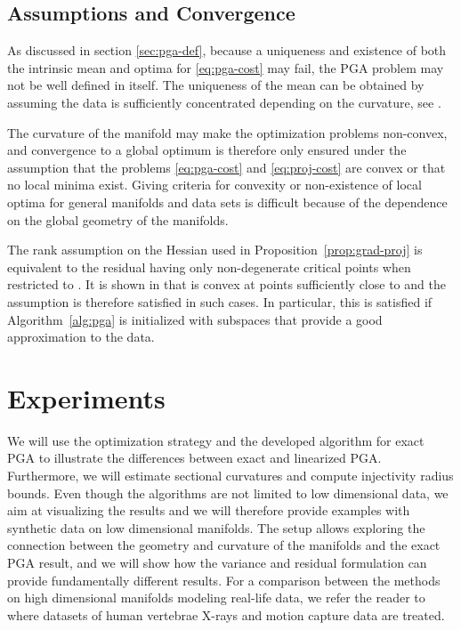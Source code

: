 \documentclass[final]{svjour3}
\begin{document}
\subsection{Assumptions and Convergence}
As discussed in section \ref{sec:pga-def}, because a uniqueness and existence of
both the intrinsic mean and optima for \eqref{eq:pga-cost} may fail, the PGA
problem may not be well defined in itself. The uniqueness of the mean can be
obtained by assuming the data is sufficiently concentrated depending on the
curvature, see \cite{karcher_riemannian_1977}.

The curvature of the manifold may make the optimization problems non-convex,
and convergence to a global optimum is therefore only
ensured under the assumption that the problems
\eqref{eq:pga-cost} and \eqref{eq:proj-cost} are convex or that no local minima
exist.  Giving criteria for convexity or non-existence of local optima for
general manifolds and data sets is 
difficult because of the dependence on the global geometry of the manifolds.

The rank assumption on the Hessian used in Proposition~\ref{prop:grad-proj} is
equivalent to the residual  having only non-degenerate critical points when
restricted to . 
It is shown in \cite{karcher_riemannian_1977} that  is convex at points sufficiently
close to  and the assumption is therefore satisfied in such cases. In
particular, this is satisfied if Algorithm~\ref{alg:pga} is initialized with
subspaces that provide a good approximation to the data.


\section{Experiments}
\label{sec:experiments}
We will use the optimization strategy and the developed algorithm for exact PGA
to illustrate the
differences between exact and linearized PGA. Furthermore, we will estimate sectional
curvatures and compute injectivity radius bounds.
Even though the algorithms are not limited to low dimensional data, we aim at visualizing the
results and we will therefore provide examples with synthetic data on low
dimensional manifolds. The setup allows exploring the connection between
the geometry and curvature of the manifolds and the exact PGA result, and we
will show how the variance and residual formulation can provide fundamentally
different results.
For a comparison between the methods on high dimensional 
manifolds modeling real-life data, we refer the reader to
\cite{sommer_manifold_2010} where datasets of
human vertebrae X-rays and motion capture data are treated.
\end{document}
